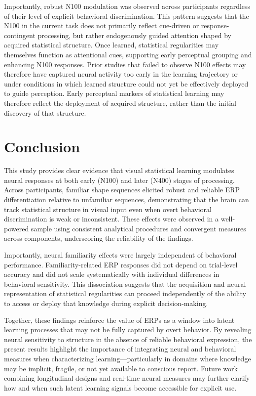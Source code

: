 Importantly, robust N100 modulation was observed across participants regardless of their level of explicit behavioral discrimination. This pattern suggests that the N100 in the current task does not primarily reflect cue-driven or response-contingent processing, but rather endogenously guided attention shaped by acquired statistical structure. Once learned, statistical regularities may themselves function as attentional cues, supporting early perceptual grouping and enhancing N100 responses. Prior studies that failed to observe N100 effects may therefore have captured neural activity too early in the learning trajectory or under conditions in which learned structure could not yet be effectively deployed to guide perception. Early perceptual markers of statistical learning may therefore reflect the deployment of acquired structure, rather than the initial discovery of that structure.




\section*{Conclusion}

This study provides clear evidence that visual statistical learning modulates neural responses at both early (N100) and later (N400) stages of processing. Across participants, familiar shape sequences elicited robust and reliable ERP differentiation relative to unfamiliar sequences, demonstrating that the brain can track statistical structure in visual input even when overt behavioral discrimination is weak or inconsistent. These effects were observed in a well-powered sample using consistent analytical procedures and convergent measures across components, underscoring the reliability of the findings.

Importantly, neural familiarity effects were largely independent of behavioral performance. Familiarity-related ERP responses did not depend on trial-level accuracy and did not scale systematically with individual differences in behavioral sensitivity. This dissociation suggests that the acquisition and neural representation of statistical regularities can proceed independently of the ability to access or deploy that knowledge during explicit decision-making.

Together, these findings reinforce the value of ERPs as a window into latent learning processes that may not be fully captured by overt behavior. By revealing neural sensitivity to structure in the absence of reliable behavioral expression, the present results highlight the importance of integrating neural and behavioral measures when characterizing learning—particularly in domains where knowledge may be implicit, fragile, or not yet available to conscious report. Future work combining longitudinal designs and real-time neural measures may further clarify how and when such latent learning signals become accessible for explicit use.